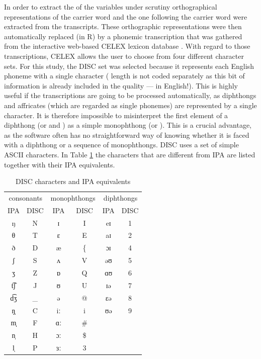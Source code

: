 In order to extract the  of the variables under scrutiny orthographical representations of the carrier word and the one following the carrier word were extracted from the transcripts.
These orthographic representations were then automatically replaced (in R) by a phonemic transcription that was gathered from the interactive web-based CELEX lexicon database \parencite{baayenetal1993}.
With regard to those transcriptions, CELEX allows the user to choose from four different character sets.
For this study, the DISC set was selected because it represents each English phoneme with a single character ( length is not coded separately as this bit of information is already included in the  quality --- in English!).
This is highly useful if the transcriptions are going to be processed automatically, as diphthongs and affricates (which are regarded as single phonemes) are represented by a single character.
It is therefore impossible to misinterpret the first element of a diphthong (or and ) as a simple monophthong (or ).
This is a crucial advantage, as the software often has no straightforward way of knowing whether it is faced with a diphthong or a sequence of monophthongs.
DISC uses a set of simple ASCII characters.
In Table \ref{tab.DISC} the characters that are different from IPA are listed together with their IPA equivalents.

	\begin{table}[h]
		\centering
		\caption{DISC characters and IPA equivalents}
		\begin{tabular}{cccccc}
			\hline
			\multicolumn{2}{c}{consonants} & \multicolumn{2}{c}{monophthongs} & \multicolumn{2}{c}{diphthongs}\\
			IPA & DISC & IPA & DISC & IPA & DISC\\
			\hline
			ŋ & N & ɪ & I & eɪ & 1\\
			θ & T & ɛ & E & aɪ & 2\\
			ð & D & æ & \{ & ɔɪ & 4\\
			ʃ & S & ʌ & V & əʊ & 5\\
			ʒ & Z & ɒ & Q & ɑʊ & 6\\
			t͡ʃ & J & ʊ & U & ɪə & 7\\
			d͡ʒ & \_ & ə & @ & ɛə & 8\\
			ŋ̩ & C & iː & i & ʊə & 9\\
			m̩̩ & F & ɑː & \# &&\\
			n̩ & H & ɔː & \$ &&\\
			l̩ & P & ɜː & 3 &&\\
			\hline
		\end{tabular}
		\label{tab.DISC}
	\end{table}

